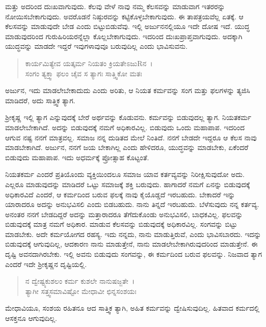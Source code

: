 ಮತ್ತು ಅದರಿಂದ ದುಃಖವಾಗುವುದು. ಕೆಲವು ವೇಳೆ ನಾವು ನಮ್ಮ ಕೆಲಸವನ್ನು ಮಾಡುವಾಗ ಇತರರನ್ನು ನೋಯಿಸಬೇಕಾಗುವುದು. ಅವರೊಡನೆ ನಿಷ್ಠುರವನ್ನು ಕಟ್ಟಿಕೊಳ್ಳಬೇಕಾಗುವುದು. ಈ ತಾಪತ್ರಯವೆಲ್ಲ ಏತಕ್ಕೆ. ಆ ಕೆಲಸವನ್ನು ಮಾಡುವುದೇ ಬೇಡ ಎಂದು ಬಿಟ್ಟುಬಿಡುವೆವು. ಇಲ್ಲಿ ಅರ್ಜುನನಲ್ಲಿಯೂ ಇದೇ ದೋಷ ಇದೆ. ಯುದ್ಧ ಮಾಡುವುದರಿಂದ ಗುರುಹಿರಿಯರನ್ನೆಲ್ಲಾ ಕೊಲ್ಲಬೇಕಾಗುವುದು. ಇದರಿಂದ ದುಃಖಪ್ರಾಪ್ತವಾಗುವುದು. ಅದಕ್ಕಾಗಿ ಯುದ್ಧವನ್ನು ಮಾಡದೇ ಇದ್ದರೆ ಇವುಗಳಾವುವೂ ಬರುವುದಿಲ್ಲ ಎಂದು ಭಾವಿಸುವನು.

\begin{verse}
ಕಾರ್ಯಮಿತ್ಯೇವ ಯತ್ಕರ್ಮ ನಿಯತಂ ಕ್ರಿಯತೇಽಜುRನ~।\\ಸಂಗಂ ತ್ಯಕ್ತ್ವಾ ಫಲಂ ಚೈವ ಸ ತ್ಯಾಗಃ ಸಾತ್ತ್ವಿಕೋ ಮತಃ 
\end{verse}

{\small ಅರ್ಜುನ, ಇದು ಮಾಡಲೇಬೇಕಾದುದು ಎಂದು ಅರಿತು, ಆ ನಿಯತ ಕರ್ಮವನ್ನು ಸಂಗ ಮತ್ತು ಫಲಗಳನ್ನು ತ್ಯಜಿಸಿ ಮಾಡಿದರೆ, ಅದು ಸಾತ್ತ್ವಿಕ ತ್ಯಾಗ. }

ಶ‍್ರೀಕೃಷ್ಣ ಇಲ್ಲಿ ತ್ಯಾಗ ಎನ್ನುವುದಕ್ಕೆ ಬೇರೆ ಅರ್ಥವನ್ನು ಕೊಡುವನು. ಕರ್ಮವನ್ನು ಬಿಡುವುದಲ್ಲ ತ್ಯಾಗ. ನಿಯತಕರ್ಮ ಮಾಡಲೇಬೇಕಾಗಿದೆ. ಅದನ್ನು ಬಿಡುವುದಕ್ಕೆ ನಮಗೆ ಅಧಿಕಾರವಿಲ್ಲ. ಬಿಡುವುದು ಒಂದು ಮಹಾಪಾಪ. ಇದರಿಂದ ಆಗುವ ನಷ್ಟ ನನಗೆ ಮಾತ್ರವಲ್ಲ. ಸಮಾಜ ನನ್ನ ದುಡಿತದ ಮೇಲೆ ನಿಂತಿದೆ. ನನಗೆ ಬೇಡದೇ ಇದ್ದರೂ ಆ ಕೆಲಸ ನಾವು ಮಾಡಬೇಕಾಗಿದೆ. ಅರ್ಜುನ, ನನಗೆ ಜಯ ಬೇಕಾಗಿಲ್ಲ ಎಂದು ಹೇಳಿದರೂ, ಯುದ್ಧವನ್ನು ಮಾಡಬೇಕು, ಏಕೆಂದರೆ ಬಿಡುವುದು ಮಹಾಪಾಪ. ಇದು ಅಧರ್ಮಕ್ಕೆ ಪ್ರೋತ್ಸಾಹ ಕೊಟ್ಟಂತೆ.

ನಿಯತಕರ್ಮ ಎಂದರೆ ಪ್ರತಿಯೊಂದು ವ್ಯಕ್ತಿಯಿಂದಲೂ ಸಮಾಜ ಯಾವ ಕರ್ತವ್ಯವನ್ನು ನಿರೀಕ್ಷಿಸುವುದೋ ಅದು. ಎಲ್ಲರೂ ಮಾಡುವುದನ್ನು ಮಾಡಿದರೆ ಒಟ್ಟು ಸಮಾಜಕ್ಕೆ ಶಕ್ತಿ ಬರುವುದು. ಹಾಗಾದರೆ ನಮಗೆ ಏನನ್ನು ಬಿಡುವುದಕ್ಕೆ ಅಧಿಕಾರವಿದೆ ಎಂದರೆ, ಆ ಕರ್ಮದಿಂದ ಬರುವ ಫಲಕ್ಕೆ ನಾವು ಕೈಯೊಡ್ಡದೆ ಇರಬಹುದು. ಬೇಕಾದರೆ ಇನ್ನು ಯಾರಾದರೂ ಅದನ್ನು ಅನುಭವಿಸಲಿ ಎಂದು ಬಿಡಬಹುದು. ನಾನು ತಿನ್ನದೆ ಇರಬಹುದು. ಬೆಳೆಸುವುದು ನನ್ನ ಕರ್ತವ್ಯ. ಅನಂತರ ನನಗೆ ಬೇಡದಿದ್ದರೆ ಅದನ್ನು ಮತ್ತಾರಾದರೂ ತೆಗೆದುಕೊಂಡು ಅನುಭವಿಸಲಿ, ಬಾಧಕವಿಲ್ಲ. ಫಲವನ್ನು ಬಿಡುವುದಕ್ಕೆ ಮಾತ್ರ ನಮಗೆ ಅಧಿಕಾರ. ಮಾಡುವ ಕೆಲಸವನ್ನು ಬಿಡುವುದಕ್ಕೆ ಅಧಿಕಾರವಿಲ್ಲ. ಸಂಗವನ್ನು ಬಿಟ್ಟು ಮಾಡಬೇಕು. ಅದೇ ಕರ್ಮಯೋಗದ ರಹಸ್ಯ. ಇದು ನನ್ನದು, ನಾನು ಮಾಡುತ್ತಿರುವೆ, ಎಂದು ಭಾವಿಸಬಾರದು. ಇದನ್ನು ಬಿಡುವುದಕ್ಕೆ ಆಗುವುದಿಲ್ಲ, ಆದಕಾರಣ ನಾನು ಮಾಡುತ್ತೇನೆ, ನಾನು ಮಾಡಲೇಬೇಕಾಗಿರುವುದರಿಂದ ಮಾಡುತ್ತೇನೆ. ಈ ದೃಷ್ಟಿ ಅವನದಾಗಿರಬೇಕು. ಇಲ್ಲಿ ಅವನು ಬಿಡುವುದು ಸಂಗವನ್ನು, ಈ ಕರ್ಮದಿಂದ ಬರುವ ಫಲವನ್ನು. ನಿಜವಾದ ತ್ಯಾಗ ಎಂದರೆ ಇದೇ ಶ‍್ರೀಕೃಷ್ಣನ ದೃಷ್ಟಿಯಲ್ಲಿ.

\begin{verse}
ನ ದ್ವೇಷ್ಟ್ಯಕುಶಲಂ ಕರ್ಮ ಕುಶಲೇ ನಾನುಷಜ್ಜತೇ~।\\ತ್ಯಾಗೀ ಸತ್ತ್ವಸಮಾವಿಷ್ಟೋ ಮೇಧಾವೀ ಛಿನ್ನಸಂಶಯಃ 
\end{verse}

{\small ಮೇಧಾವಿಯೂ, ಸಂಶಯ ರಹಿತನೂ ಆದ ಸಾತ್ತ್ವಿಕ ತ್ಯಾಗಿ, ಅಹಿತ ಕರ್ಮವನ್ನು ದ್ವೇಷಿಸುವುದಿಲ್ಲ. ಹಿತವಾದ ಕರ್ಮದಲ್ಲಿ ಆಸಕ್ತನೂ ಆಗುವುದಿಲ್ಲ.}

